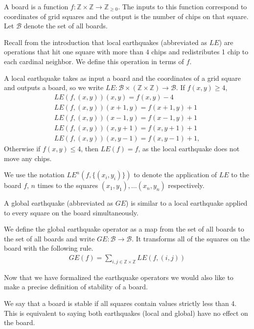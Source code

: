 \documentclass[runningheads,a4paper]{llncs}
\begin{document}
\begin{definition} A board is a function $f: \mathbb{Z} \times \mathbb{Z} \to \mathbb{Z}_{\geq 0}$.
The inputs to this function correspond to coordinates of grid squares and the output is the number of chips on that square. Let $\mathcal{B}$ denote the set of all boards.
\end{definition}

Recall from the introduction that local earthquakes (abbreviated as $LE$) are operations that hit one square with more than $4$ chips and redistributes 1 chip to each cardinal neighbor. We define this operation in terms of $f$.

\begin{definition}
A local earthquake takes as input a board and the coordinates of a grid square and outputs a board, so we write $LE: \mathcal{B} \times (\mathbb{Z} \times \mathbb{Z}) \rightarrow \mathcal{B}$. If $f(x,y) \geq 4$,
\begin{align*}
LE(f, (x,y))(x,y) = f(x,y)-4 \\
LE( f, (x,y))(x+1, y) = f(x+1,y)+1 \\
LE( f, (x,y))(x-1, y) = f(x-1,y)+1 \\
LE( f, (x,y))(x, y+1) = f(x,y+1)+1 \\
LE( f, (x,y))(x, y-1) = f(x,y-1)+1,
\end{align*}
Otherwise if $f(x,y) \leq 4$, then $LE(f) = f$, as the local earthquake does not move any chips.
\end{definition}
We use the notation $LE^n(f, \{(x_i,y_i)\})$ to denote the application of $LE$ to the board $f$, $n$ times to the squares $(x_1, y_1), \ldots (x_{n}, y_{n})$ respectively. 

A global earthquake (abbreviated as $GE$) is similar to a local earthquake applied to every square on the board simultaneously.

\begin{definition} We define the global earthquake operator as a map from the set of all boards to the set of all boards and write $GE: \mathcal{B} \rightarrow \mathcal{B}$. 
It transforms all of the squares on the board with the following rule.
\begin{align*}
GE(f) = \sum_{i, j \in \mathbb{Z}\times \mathbb{Z}} LE(f, (i,j))
\end{align*}
\end{definition}

Now that we have formalized the earthquake operators we would also like to make a precise definition of stability of a board.
\begin{definition}
We say that a board is stable if all squares contain values strictly less than 4. This is equivalent to saying both earthquakes (local and global) have no effect on the board. 
\end{definition}
\end{document}
